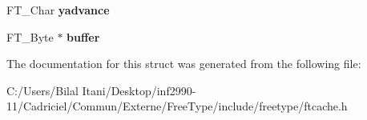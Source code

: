 \begin{DoxyCompactItemize}
\item 
F\+T\+\_\+\+Char {\bfseries yadvance}\hypertarget{struct_f_t_c___s_bit_rec___aabe767ddaf7ff62918886c6f62e9ac28}{}\label{struct_f_t_c___s_bit_rec___aabe767ddaf7ff62918886c6f62e9ac28}

\item 
F\+T\+\_\+\+Byte $\ast$ {\bfseries buffer}\hypertarget{struct_f_t_c___s_bit_rec___abe4d78fc3f411d67e7fc43f7aa21bd1d}{}\label{struct_f_t_c___s_bit_rec___abe4d78fc3f411d67e7fc43f7aa21bd1d}

\end{DoxyCompactItemize}


The documentation for this struct was generated from the following file\+:\begin{DoxyCompactItemize}
\item 
C\+:/\+Users/\+Bilal Itani/\+Desktop/inf2990-\/11/\+Cadriciel/\+Commun/\+Externe/\+Free\+Type/include/freetype/ftcache.\+h\end{DoxyCompactItemize}
